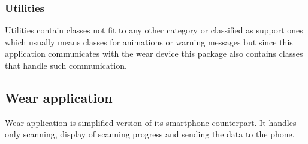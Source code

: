 \subsubsection{Utilities}\label{subsec:Utilities}
Utilities contain classes not fit to any other category or classified as support ones which usually means classes for animations or warning messages but since this application communicates with the wear device this package also contains classes that handle such communication.

\subsection{Wear application}\label{subsec:WearApplication}
Wear application is simplified version of its smartphone counterpart. It handles only scanning, display of scanning progress and sending the data to the phone. 